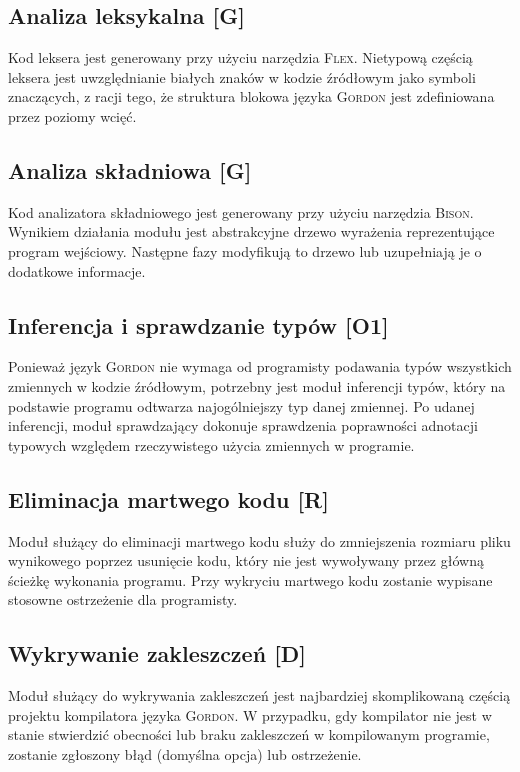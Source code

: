 \documentclass{documentation}
\begin{document}
\subsection{Analiza leksykalna [G]}
\noindent Kod leksera jest generowany przy użyciu narzędzia \textsc{Flex}. Nietypową
częścią leksera jest uwzględnianie białych znaków w kodzie źródłowym jako symboli znaczących,
z racji tego, że struktura blokowa języka \textsc{Gordon} jest zdefiniowana przez poziomy wcięć.

\subsection{Analiza składniowa [G]}
\noindent Kod analizatora składniowego jest generowany przy użyciu narzędzia \textsc{Bison}.
Wynikiem działania modułu jest abstrakcyjne drzewo wyrażenia reprezentujące program wejściowy.
Następne fazy modyfikują to drzewo lub uzupełniają je o dodatkowe informacje.

\subsection{Inferencja i sprawdzanie typów [O1]}
\noindent Ponieważ język \textsc{Gordon} nie wymaga od programisty podawania typów wszystkich
zmiennych w kodzie źródłowym, potrzebny jest moduł inferencji typów, który na podstawie
programu odtwarza najogólniejszy typ danej zmiennej. Po udanej inferencji, moduł sprawdzający
dokonuje sprawdzenia poprawności adnotacji typowych względem rzeczywistego użycia zmiennych
w programie.

\subsection{Eliminacja martwego kodu [R]}
\noindent Moduł służący do eliminacji martwego kodu służy do zmniejszenia rozmiaru pliku wynikowego
poprzez usunięcie kodu, który nie jest wywoływany przez główną ścieżkę wykonania programu.
Przy wykryciu martwego kodu zostanie wypisane stosowne ostrzeżenie dla programisty.

\subsection{Wykrywanie zakleszczeń [D]}
\noindent Moduł służący do wykrywania zakleszczeń jest najbardziej skomplikowaną częścią projektu
kompilatora języka \textsc{Gordon}. W przypadku, gdy kompilator nie jest w stanie stwierdzić obecności lub braku zakleszczeń w kompilowanym programie, zostanie zgłoszony błąd (domyślna opcja)
lub ostrzeżenie.
\end{document}
